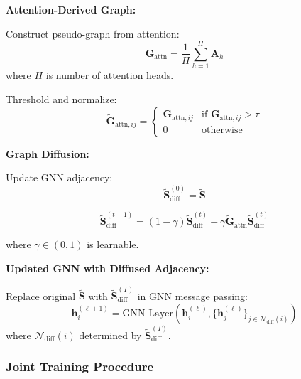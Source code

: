 \documentclass[12pt,en]{elegantpaper}
\begin{document}
\textbf{Attention-Derived Graph:}

Construct pseudo-graph from attention:
\begin{equation}
    \mathbf{G}_{\text{attn}} = \frac{1}{H} \sum_{h=1}^H \mathbf{A}_h
\end{equation}
where $H$ is number of attention heads.

Threshold and normalize:
\begin{equation}
    \mathbf{\tilde{G}}_{\text{attn}, ij} = \begin{cases}
        \mathbf{G}_{\text{attn}, ij} & \text{if } \mathbf{G}_{\text{attn}, ij} > \tau \\
        0 & \text{otherwise}
    \end{cases}
\end{equation}

\textbf{Graph Diffusion:}

Update GNN adjacency:
\begin{equation}
    \mathbf{\tilde{S}}_{\text{diff}}^{(0)} = \mathbf{\tilde{S}}
\end{equation}

\begin{equation}
    \mathbf{\tilde{S}}_{\text{diff}}^{(t+1)} = (1-\gamma) \mathbf{\tilde{S}}_{\text{diff}}^{(t)} + \gamma \mathbf{\tilde{G}}_{\text{attn}} \mathbf{\tilde{S}}_{\text{diff}}^{(t)}
    \label{eq:graph_diffusion}
\end{equation}

where $\gamma \in (0,1)$ is learnable.

\textbf{Updated GNN with Diffused Adjacency:}

Replace original $\mathbf{\tilde{S}}$ with $\mathbf{\tilde{S}}_{\text{diff}}^{(T)}$ in GNN message passing:
\begin{equation}
    \mathbf{h}_i^{(\ell+1)} = \text{GNN-Layer}(\mathbf{h}_i^{(\ell)}, \{\mathbf{h}_j^{(\ell)}\}_{j \in \mathcal{N}_{\text{diff}}(i)})
\end{equation}
where $\mathcal{N}_{\text{diff}}(i)$ determined by $\mathbf{\tilde{S}}_{\text{diff}}^{(T)}$.

\subsubsection{Joint Training Procedure}
\end{document}

